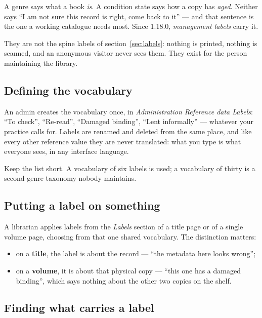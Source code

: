 A genre says what a book \emph{is}. A condition state says how a copy
has \emph{aged}. Neither says ``I am not sure this record is right,
come back to it'' --- and that sentence is the one a working catalogue
needs most. Since 1.18.0, \emph{management
labels} carry it.

They are not the spine labels of section~\ref{sec:labels}: nothing is
printed, nothing is scanned, and an anonymous visitor never sees them.
They exist for the person maintaining the library.

\subsection*{Defining the vocabulary}

An admin creates the vocabulary once, in \emph{Administration
\textrightarrow{} Reference data \textrightarrow{} Labels}: ``To
check'', ``Re-read'', ``Damaged binding'', ``Lent informally'' ---
whatever your practice calls for. Labels are renamed and deleted from
the same place, and like every other reference value they are never
translated: what you type is what everyone sees, in any interface
language.

Keep the list short. A vocabulary of six labels is used; a vocabulary
of thirty is a second genre taxonomy nobody maintains.

\subsection*{Putting a label on something}

A librarian applies labels from the \emph{Labels} section of a title
page or of a single volume page, choosing from that one shared
vocabulary. The distinction matters:

\begin{itemize}
  \item on a \textbf{title}, the label is about the record --- ``the
        metadata here looks wrong'';
  \item on a \textbf{volume}, it is about that physical copy --- ``this
        one has a damaged binding'', which says nothing about the other
        two copies on the shelf.
\end{itemize}

\subsection*{Finding what carries a label}

